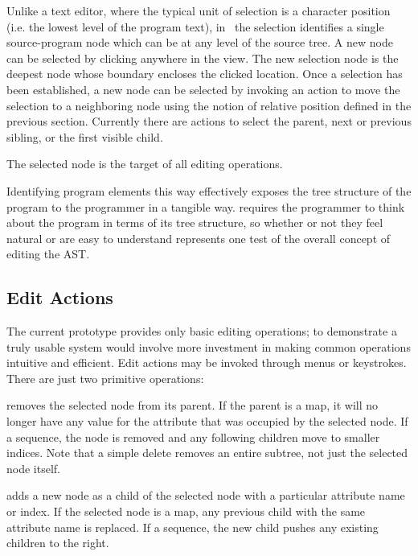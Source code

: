Unlike a text editor, where the typical unit of selection is a character position (i.e. the lowest level of the program text), in \Meta\ the selection identifies a single source-program node which can be at any level of the source tree. A new node can be selected by clicking anywhere in the view. The new selection node is the deepest node whose boundary encloses the clicked location. Once a selection has been established, a new node can be selected by invoking an action to move the selection to a neighboring node using the notion of relative position defined in the previous section. Currently there are actions to select the parent, next or previous sibling, or the first visible child.


The selected node is the target of all editing operations.

Identifying program elements this way effectively exposes the tree structure of the program to the programmer in a tangible way. requires the programmer to think about the program in terms of its tree structure, so whether or not they feel natural or are easy to understand represents one test of the overall concept of editing the AST.


\subsection{Edit Actions}
The current prototype provides only basic editing operations; to demonstrate a truly usable system would involve more investment in making common operations intuitive and efficient. Edit actions may be invoked through menus or keystrokes. There are just two primitive operations:

 removes the selected node from its parent. If the parent is a map, it will no longer have any value for the attribute that was occupied by the selected node. If a sequence, the node is removed and any following children move to smaller indices. Note that a simple delete removes an entire subtree, not just the selected node itself.

 adds a new node as a child of the selected node with a particular attribute name or index. If the selected node is a map, any previous child with the same attribute name is replaced. If a sequence, the new child pushes any existing children to the right.

